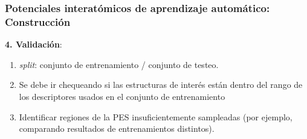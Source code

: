 \documentclass[aspectratio=169]{beamer}
\let\oldtextbf\textbf
\renewcommand{\textbf}[1]{\textcolor{nordblue}{\oldtextbf{#1}}}
\begin{document}
    \begin{frame}
        \frametitle{Potenciales interatómicos de aprendizaje automático: Construcción}

        \textbf{4. Validación}:
        \begin{enumerate}
            \item \textit{split}: conjunto de entrenamiento / conjunto de testeo.
            \item Se debe ir chequeando si las estructuras de interés están dentro
                del rango de los descriptores usados en el conjunto de 
                entrenamiento
            \item Identificar regiones de la PES insuficientemente sampleadas 
                (por ejemplo, comparando resultados de entrenamientos distintos).
        \end{enumerate}

	\end{frame}
\end{document}
